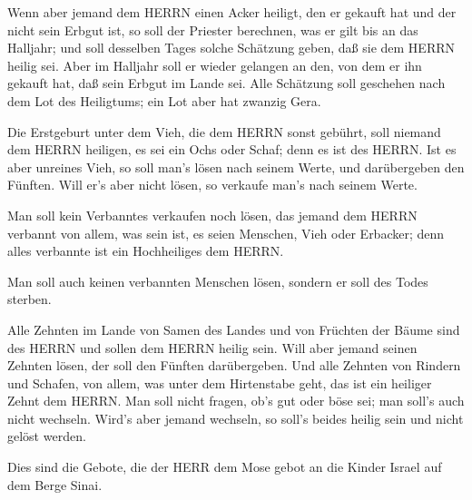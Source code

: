  Wenn aber jemand dem HERRN einen Acker heiligt, den er
gekauft hat und der nicht sein Erbgut ist,  so soll der
Priester berechnen, was er gilt bis an das Halljahr; und soll desselben
Tages solche Schätzung geben, daß sie dem HERRN heilig sei.
 Aber im Halljahr soll er wieder gelangen an den, von dem
er ihn gekauft hat, daß sein Erbgut im Lande sei.  Alle
Schätzung soll geschehen nach dem Lot des Heiligtums; ein Lot aber hat
zwanzig Gera.

 Die Erstgeburt unter dem Vieh, die dem HERRN sonst
gebührt, soll niemand dem HERRN heiligen, es sei ein Ochs oder Schaf;
denn es ist des HERRN.  Ist es aber unreines Vieh, so soll
man's lösen nach seinem Werte, und darübergeben den Fünften. Will er's
aber nicht lösen, so verkaufe man's nach seinem Werte.

 Man soll kein Verbanntes verkaufen noch lösen, das jemand
dem HERRN verbannt von allem, was sein ist, es seien Menschen, Vieh oder
Erbacker; denn alles verbannte ist ein Hochheiliges dem HERRN.

 Man soll auch keinen verbannten Menschen lösen, sondern er
soll des Todes sterben.

 Alle Zehnten im Lande von Samen des Landes und von
Früchten der Bäume sind des HERRN und sollen dem HERRN heilig sein.
 Will aber jemand seinen Zehnten lösen, der soll den
Fünften darübergeben.  Und alle Zehnten von Rindern und
Schafen, von allem, was unter dem Hirtenstabe geht, das ist ein heiliger
Zehnt dem HERRN.  Man soll nicht fragen, ob's gut oder böse
sei; man soll's auch nicht wechseln. Wird's aber jemand wechseln, so
soll's beides heilig sein und nicht gelöst werden.

 Dies sind die Gebote, die der HERR dem Mose gebot an die
Kinder Israel auf dem Berge Sinai.
